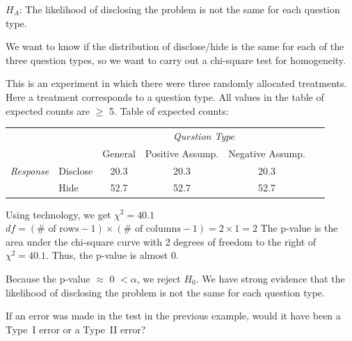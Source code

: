 \begin{examplewrap}
\begin{nexample}
\begin{description}
\newline $H_A$: The likelihood of disclosing the problem is not the same for each question type.  
\item[\inferencestep{Choose}] We want to know if the distribution of disclose/hide is the same for each of the three question types, so we want to carry out a chi-square test for homogeneity.  
\item[\inferencestep{Check}] This is an experiment in which there were three randomly allocated treatments.  Here a treatment corresponds to a question type.  All values in the table of expected counts are $\ge$ 5.
Table of expected counts:\vspace{-4mm}
\begin{center}
\begin{tabular}{l l c c c l}
								&			& \multicolumn{3}{c}{\textit{Question Type}}	&\hspace{17mm}\ 		\\
\cline{3-5}
								&			& General		& Positive Assump. & Negative Assump.	\\
\cline{2-5}
\textit{Response}									& Disclose		& 20.3		& 20.3 & 20.3 	\\
				& Hide			& 52.7		& 52.7 &  52.7	\\
\cline{2-5}
\end{tabular}
\end{center}

\item[\inferencestep{Calculate}]  Using technology, we get $\chi^2 = 40.1$
\newline $df = (\# \text{ of rows} - 1) \times (\# \text{ of columns} - 1) = 2\times 1 = 2$
\newline  The p-value is the area under the chi-square curve with 2 degrees of freedom to the right of $\chi^2=40.1$.  Thus, the p-value is almost 0.
\item[\inferencestep{Conclude}]  Because the p-value $\approx$ 0 $ < \alpha$, we reject $H_0$. We have strong evidence that the likelihood of disclosing the problem is not the same for each question type.
\end{description}
\end{nexample}
\end{examplewrap}

\begin{exercisewrap}
\begin{nexercise}
If an error was made in the test in the previous example, would it have been a Type~I error or a Type~II error?\footnotemark
\end{nexercise}
\end{exercisewrap}



